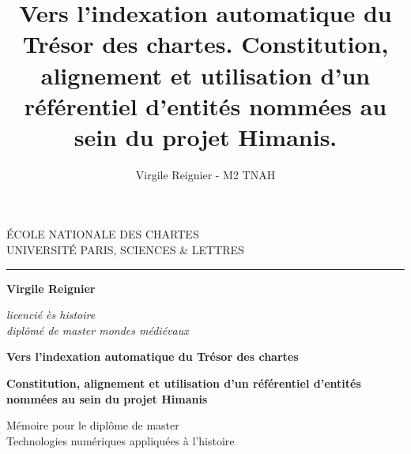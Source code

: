 \documentclass[a4paper,12pt,twoside]{book}
\author{Virgile Reignier - M2 TNAH}
\title{Vers l’indexation automatique du Trésor des chartes. Constitution, alignement et utilisation d'un référentiel d’entités nommées au sein du projet Himanis.}
\begin{document}
	\begin{titlepage}
		\begin{center}
			
			\bigskip
			
			\begin{large}				
				ÉCOLE NATIONALE DES CHARTES\\
				UNIVERSITÉ PARIS, SCIENCES \& LETTRES
			\end{large}
			\begin{center}\rule{2cm}{0.02cm}\end{center}
			
			\bigskip
			\bigskip
			\bigskip
			\begin{Large}
				\textbf{Virgile Reignier}\\
			\end{Large}
			\begin{normalsize} \textit{licencié ès histoire}\\
				\textit{diplômé de master mondes médiévaux}
			\end{normalsize}
			
			\bigskip
			\bigskip
			\bigskip
			
			\begin{Huge}
				\textbf{Vers l’indexation automatique du Trésor des chartes}\\
			\end{Huge}
			\bigskip
			\bigskip
			\begin{LARGE}
				\textbf{Constitution, alignement et utilisation d'un référentiel d’entités nommées au sein du projet Himanis}\\
			\end{LARGE}
			
			\bigskip
			\bigskip
			\bigskip
			\begin{large}
			\end{large}
			\vfill
			
			\begin{large}
				Mémoire 
				pour le diplôme de master \\
				\og{} Technologies numériques appliquées à l'histoire \fg{} \\
			\end{large}
			
		\end{center}
	\end{titlepage}
	
	\thispagestyle{empty}	
	\cleardoublepage
	
	\frontmatter
\end{document}

